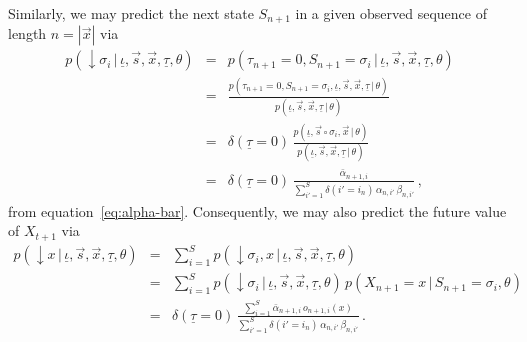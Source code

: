 \documentclass[a4paper]{article}
\newcommand{\dn}{\downarrow\!}
\begin{document}
Similarly, we may predict the next state $S_{n+1}$ in a given observed sequence of length $n=|\vec{x}|$ via
\begin{eqnarray}
  p(\dn\sigma_i\,|\,\underline{\iota},\vec{s},\vec{x},\underline{\tau},\theta)  
& = &
  p(\tau_{n+1}\!=\!0,S_{n+1}\!=\!\sigma_i\,|\,\underline{\iota},\vec{s},\vec{x},\underline{\tau},\theta) 
\nonumber\\& = &
  \frac{p(\tau_{n+1}\!=\!0,S_{n+1}\!=\!\sigma_i,\underline{\iota},\vec{s},\vec{x},\underline{\tau}\,|\,\theta)}
       {p(\underline{\iota},\vec{s},\vec{x},\underline{\tau}\,|\,\theta)}
\nonumber\\& = & 
  \delta(\underline{\tau}\!=\!0)\,
  \frac{p(\underline{\iota},\vec{s}\circ\sigma_i,\vec{x}\,|\,\theta)}
       {p(\underline{\iota},\vec{s},\vec{x},\underline{\tau}\,|\,\theta)}
\nonumber\\& = & 
  \delta(\underline{\tau}\!=\!0)\,
  \frac{\bar{\alpha}_{n+1,i}}
       {\sum_{i'=1}^S\delta(i'\!=\!i_n)\,\alpha_{n,i'}\,\beta_{n,i'}}
\,,
\end{eqnarray}
from equation~\eqref{eq:alpha-bar}.
Consequently, we may also predict the future value of $X_{t+1}$ via
\begin{eqnarray}
  p(\dn x\,|\,\underline{\iota},\vec{s},\vec{x},\underline{\tau},\theta)  
& = &
\sum_{i=1}^{S}p(\dn \sigma_i,x\,|\,\underline{\iota},\vec{s},\vec{x},\underline{\tau},\theta) 
\nonumber\\& = &
\sum_{i=1}^{S}p(\dn \sigma_i\,|\,\underline{\iota},\vec{s},\vec{x},\underline{\tau},\theta)\,p(X_{n+1}\!=\!x\,|\,S_{n+1}\!=\!\sigma_i,\theta)
\nonumber\\& = &
  \delta(\underline{\tau}\!=\!0)\,
  \frac{\sum_{i=1}^{S}\bar{\alpha}_{n+1,i}\,o_{n+1,i}(x)}
       {\sum_{i'=1}^S\delta(i'\!=\!i_n)\,\alpha_{n,i'}\,\beta_{n,i'}}\,.
\end{eqnarray}
\end{document}
